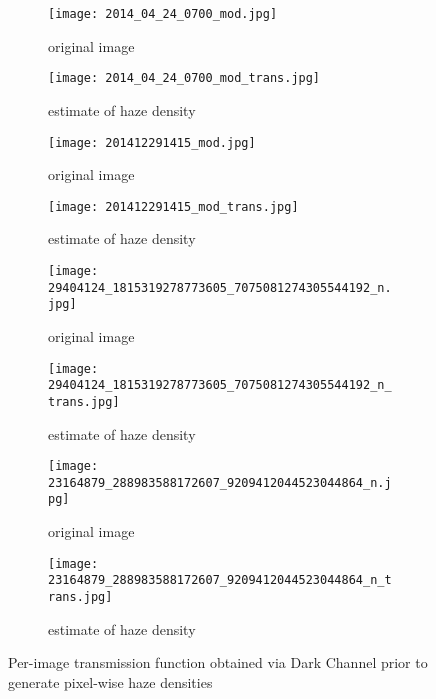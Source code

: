 \documentclass{article}
\begin{document}
\begin{figure}[H]
\centering
\begin{subfigure}{.5\textwidth}
  \centering
  \texttt{[image: 2014\_04\_24\_0700\_mod.jpg]}
  \caption{original image}
\end{subfigure}%
\begin{subfigure}{.5\textwidth}
  \centering
  \texttt{[image: 2014\_04\_24\_0700\_mod\_trans.jpg]}
  \caption{estimate of haze density}
\end{subfigure}

\begin{subfigure}{.5\textwidth}
  \centering
  \texttt{[image: 201412291415\_mod.jpg]}
  \caption{original image}
\end{subfigure}%
\begin{subfigure}{.5\textwidth}
  \centering
  \texttt{[image: 201412291415\_mod\_trans.jpg]}
  \caption{estimate of haze density}
\end{subfigure}

\begin{subfigure}{.5\textwidth}
  \centering
  \texttt{[image: 29404124\_1815319278773605\_7075081274305544192\_n.jpg]}
  \caption{original image}
\end{subfigure}%
\begin{subfigure}{.5\textwidth}
  \centering
  \texttt{[image: 29404124\_1815319278773605\_7075081274305544192\_n\_trans.jpg]}
  \caption{estimate of haze density}
\end{subfigure}

\begin{subfigure}{.5\textwidth}
  \centering
  \texttt{[image: 23164879\_288983588172607\_9209412044523044864\_n.jpg]}
  \caption{original image}
\end{subfigure}%
\begin{subfigure}{.5\textwidth}
  \centering
  \texttt{[image: 23164879\_288983588172607\_9209412044523044864\_n\_trans.jpg]}
  \caption{estimate of haze density}
\end{subfigure}
\caption{Per-image transmission function obtained via Dark Channel prior to generate pixel-wise haze densities}
\label{Per-image transmission function obtained via Dark Channel prior to generate pixel-wise haze densities}
\end{figure}

\newpage
\end{document}
